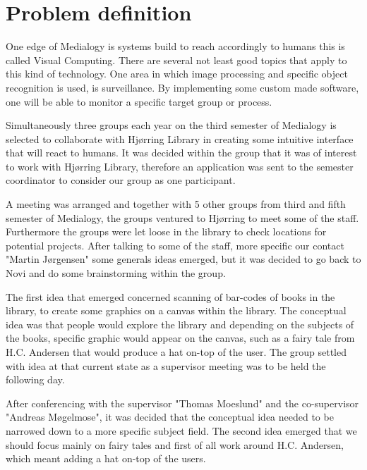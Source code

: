 \chapter{Problem definition}
One edge of Medialogy is systems build to reach accordingly to humans this is called Visual Computing. There are several not least good topics that apply to this kind of technology. One area in which image processing and specific object recognition is used, is surveillance. By implementing some custom made software, one will be able to monitor a specific target group or process. 

Simultaneously three groups each year on the third semester of Medialogy is selected to collaborate with Hjørring Library in creating some intuitive interface that will react to humans. It was decided within the group that it was of interest to work with Hjørring Library, therefore an application was sent to the semester coordinator to consider our group as one participant.

A meeting was arranged and together with 5 other groups from third and fifth semester of Medialogy, the groups ventured to Hjørring to meet some of the staff. Furthermore the groups were let loose in the library to check locations for potential projects. After talking to some of the staff, more specific our contact "Martin Jørgensen" some generals ideas emerged, but it was decided to go back to Novi and do some brainstorming within the group.

The first idea that emerged concerned scanning of bar-codes of books in the library, to create some graphics on a canvas within the library. The conceptual idea was that people would explore the library and depending on the subjects of the books, specific graphic would appear on the canvas, such as a fairy tale from H.C. Andersen that would produce a hat on-top of the user. The group settled with idea at that current state as a supervisor meeting was to be held the following day.

After conferencing with the supervisor "Thomas Moeslund" and the co-supervisor "Andreas Møgelmose", it was decided that the conceptual idea needed to be narrowed down to a more specific subject field. The second idea emerged that we should focus mainly on fairy tales and first of all work around H.C. Andersen, which meant adding a hat on-top of the users.

